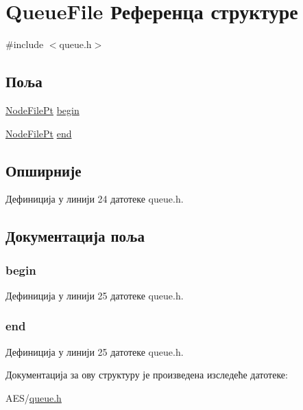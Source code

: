 \hypertarget{struct_queue_file}{\section{Queue\+File Референца структуре}
\label{struct_queue_file}
}


{\ttfamily \#include $<$queue.\+h$>$}

\subsection*{Поља}
\begin{DoxyCompactItemize}
\item 
\hyperlink{queue_8h_a21054bd6fff2213f6e09f4e5b11300b9}{Node\+File\+Pt} \hyperlink{struct_queue_file_ac7ccf2f798d1272d342ee0e54d242dd2}{begin}
\item 
\hyperlink{queue_8h_a21054bd6fff2213f6e09f4e5b11300b9}{Node\+File\+Pt} \hyperlink{struct_queue_file_aa58dc8760d68b68e762269d2673913c0}{end}
\end{DoxyCompactItemize}


\subsection{Опширније}


Дефиниција у линији 24 датотеке queue.\+h.



\subsection{Документација поља}
\hypertarget{struct_queue_file_ac7ccf2f798d1272d342ee0e54d242dd2}{
\subsubsection[{begin}]{ begin}}\label{struct_queue_file_ac7ccf2f798d1272d342ee0e54d242dd2}


Дефиниција у линији 25 датотеке queue.\+h.

\hypertarget{struct_queue_file_aa58dc8760d68b68e762269d2673913c0}{
\subsubsection[{end}]{ end}}\label{struct_queue_file_aa58dc8760d68b68e762269d2673913c0}


Дефиниција у линији 25 датотеке queue.\+h.



Документација за ову структуру је произведена изследеће датотеке\+:\begin{DoxyCompactItemize}
\item 
A\+E\+S/\hyperlink{queue_8h}{queue.\+h}\end{DoxyCompactItemize}
